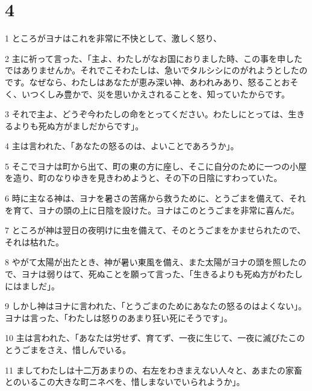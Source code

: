\chapter{4}

\par 1 ところがヨナはこれを非常に不快として、激しく怒り、
\par 2 主に祈って言った、「主よ、わたしがなお国におりました時、この事を申したではありませんか。それでこそわたしは、急いでタルシシにのがれようとしたのです。なぜなら、わたしはあなたが恵み深い神、あわれみあり、怒ることおそく、いつくしみ豊かで、災を思いかえされることを、知っていたからです。
\par 3 それで主よ、どうぞ今わたしの命をとってください。わたしにとっては、生きるよりも死ぬ方がましだからです」。
\par 4 主は言われた、「あなたの怒るのは、よいことであろうか」。
\par 5 そこでヨナは町から出て、町の東の方に座し、そこに自分のために一つの小屋を造り、町のなりゆきを見きわめようと、その下の日陰にすわっていた。
\par 6 時に主なる神は、ヨナを暑さの苦痛から救うために、とうごまを備えて、それを育て、ヨナの頭の上に日陰を設けた。ヨナはこのとうごまを非常に喜んだ。
\par 7 ところが神は翌日の夜明けに虫を備えて、そのとうごまをかませられたので、それは枯れた。
\par 8 やがて太陽が出たとき、神が暑い東風を備え、また太陽がヨナの頭を照したので、ヨナは弱りはて、死ぬことを願って言った、「生きるよりも死ぬ方がわたしにはましだ」。
\par 9 しかし神はヨナに言われた、「とうごまのためにあなたの怒るのはよくない」。ヨナは言った、「わたしは怒りのあまり狂い死にそうです」。
\par 10 主は言われた、「あなたは労せず、育てず、一夜に生じて、一夜に滅びたこのとうごまをさえ、惜しんでいる。
\par 11 ましてわたしは十二万あまりの、右左をわきまえない人々と、あまたの家畜とのいるこの大きな町ニネベを、惜しまないでいられようか」。


